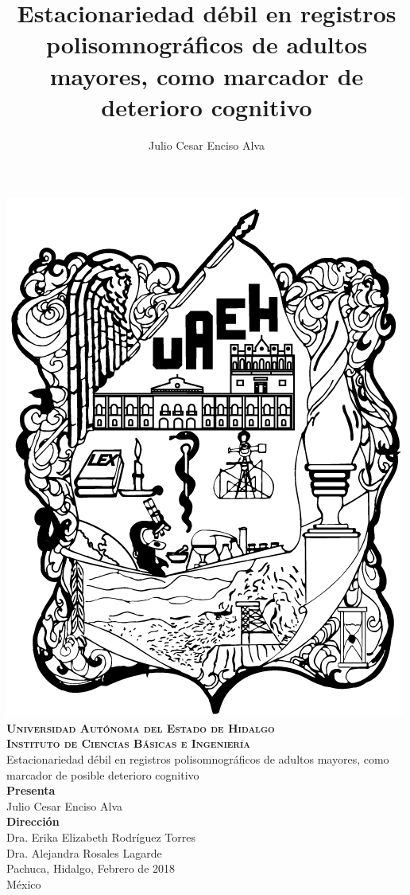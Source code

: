 \documentclass[12pt,letterpaper]{book}
\begin{document}
\setcounter{page}{0}
\thispagestyle{empty}

\title{Estacionariedad débil en registros polisomnográficos de adultos mayores,
como marcador de deterioro cognitivo}
\author{Julio Cesar Enciso Alva}

\begin{center}
    \includegraphics[width=0.2\linewidth]{./img_oficiales/logo_uaeh.png}\\
    
    {\large 
        \textbf{\textsc{
            Universidad Autónoma del Estado de Hidalgo\\
            Instituto de Ciencias Básicas e Ingeniería\\
        }}
    }
\vspace*{2.5em}
    {\huge
        Estacionariedad débil en registros polisomnográficos de adultos mayores,
        como marcador de posible deterioro cognitivo\\
    }
\vspace*{2.5em}
    {\large
        \textbf{Presenta}\\
    }
\vspace*{.25em}
    {\Large
        Julio Cesar Enciso Alva\\
    }
\vspace*{3em}
    {\large
        \textbf{Dirección}\\
    }
\vspace*{.25em}
    {\Large
        Dra. Erika Elizabeth Rodríguez Torres\\
        Dra. Alejandra Rosales Lagarde\\
    }
\vspace*{3em}
    {\large
        Pachuca, Hidalgo, Febrero de 2018\\
        M\'exico
    }
\end{center}

\newpage

\end{document}
